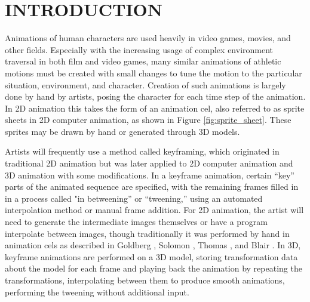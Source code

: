 
 
\chapter{INTRODUCTION}
\label{chapter:intro}

Animations of human characters are used heavily in video games, movies, and other fields.  Especially with the increasing usage of complex environment traversal in both film and video games, many similar animations of athletic motions must be created with small changes to tune the motion to the particular situation, environment, and character.  Creation of such animations is largely done by hand by artists, posing the character for each time step of the animation.  In 2D animation this takes the form of an animation cel, also referred to as sprite sheets in 2D computer animation, as shown in Figure \ref{fig:sprite_sheet}.  These sprites may be drawn by hand or generated through 3D models.

Artists will frequently use a method called keyframing, which originated in traditional 2D animation but was later applied to 2D computer animation and 3D animation with some modifications.  In a keyframe animation, certain ``key'' parts of the animated sequence are specified, with the remaining frames filled in in a process called "in betweening'' or ``tweening,'' using an automated interpolation method or manual frame addition.  For 2D animation, the artist will need to generate the intermediate images themselves or have a program interpolate between images, though traditionally it was performed by hand in animation cels as described in Goldberg \cite{goldberg_char_anim}, Solomon \cite{disney_hist}, Thomas \cite{disney_art}, and Blair \cite{cartoon_anim}.  In 3D, keyframe animations are performed on a 3D model, storing transformation data about the model for each frame and playing back the animation by repeating the transformations, interpolating between them to produce smooth animations, performing the tweening without additional input.

